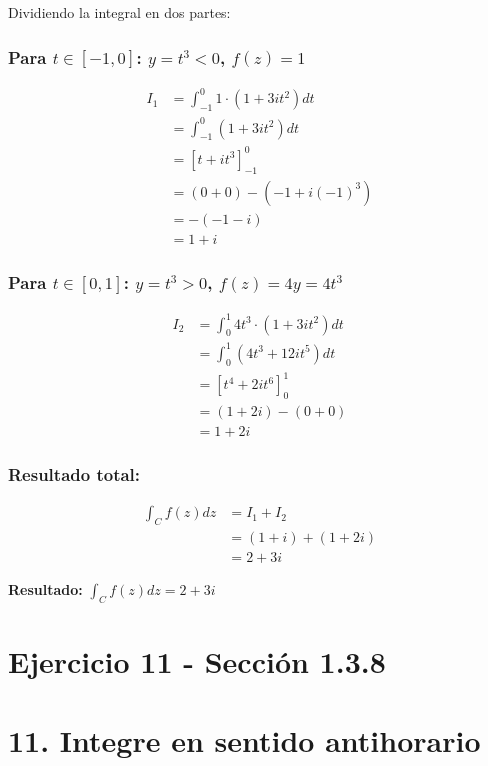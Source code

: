 \documentclass{article}
\begin{document}
Dividiendo la integral en dos partes:

\subsubsection*{Para $t \in [-1, 0]$: $y = t^3 < 0$, $f(z) = 1$}

\begin{align*}
I_1 &= \int_{-1}^0 1 \cdot (1 + 3it^2) dt \\
    &= \int_{-1}^0 (1 + 3it^2) dt \\
    &= \left[t + it^3\right]_{-1}^0 \\
    &= (0 + 0) - (-1 + i(-1)^3) \\
    &= -(-1 - i) \\
    &= 1 + i
\end{align*}

\subsubsection*{Para $t \in [0, 1]$: $y = t^3 > 0$, $f(z) = 4y = 4t^3$}

\begin{align*}
I_2 &= \int_0^1 4t^3 \cdot (1 + 3it^2) dt \\
    &= \int_0^1 (4t^3 + 12it^5) dt \\
    &= \left[t^4 + 2it^6\right]_0^1 \\
    &= (1 + 2i) - (0 + 0) \\
    &= 1 + 2i
\end{align*}

\subsubsection*{Resultado total:}

\begin{align*}
\int_C f(z) dz &= I_1 + I_2 \\
               &= (1 + i) + (1 + 2i) \\
               &= 2 + 3i
\end{align*}

\textbf{Resultado:} $\int_C f(z) dz = 2 + 3i$

\newpage
\section*{Ejercicio 11 - Sección 1.3.8}

\section*{11. Integre en sentido antihorario}
\end{document}
